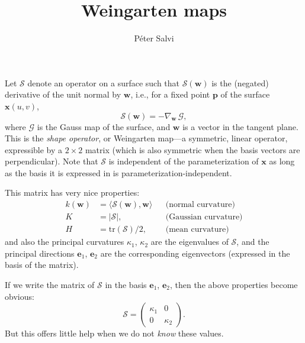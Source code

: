 \documentclass[a4paper]{article}
\begin{document}
\title{Weingarten maps}
\author{P\'eter Salvi}
\maketitle

Let $\mathcal{S}$ denote an operator on a surface such that $\mathcal{S}(\mathbf{w})$ is the
(negated) derivative of the unit normal by $\mathbf{w}$, i.e., for a fixed
point $\mathbf{p}$ of the surface $\mathbf{x}(u,v)$,
\[\mathcal{S}(\mathbf{w})=-\nabla_{\mathbf{w}}\,\mathcal{G},\]
where $\mathcal{G}$ is the Gauss map of the surface, and $\mathbf{w}$ is a
vector in the tangent plane. This is the \emph{shape operator}, or
Weingarten map---a symmetric, linear operator, expressible by a
$2\times2$ matrix (which is also symmetric when the basis vectors are
perpendicular). Note that $\mathcal{S}$ is independent of the parameterization
of $\mathbf{x}$ as long as the basis it is expressed in is
parameterization-independent.

This matrix has very nice properties:
\begin{align*}
  k(\mathbf{w})&=\langle \mathcal{S}(\mathbf{w}),\mathbf{w}\rangle&&\text{(normal curvature)}\\
  K&=|\mathcal{S}|,&&\text{(Gaussian curvature)}\\
  H&=\mathrm{tr}(\mathcal{S})/2,&&\text{(mean curvature)}
\end{align*}
and also the principal curvatures $\kappa_1$, $\kappa_2$ are the
eigenvalues of $\mathcal{S}$, and the principal directions $\mathbf{e}_1$,
$\mathbf{e}_2$ are the corresponding eigenvectors (expressed in the
basis of the matrix).

If we write the matrix of $\mathcal{S}$ in the basis $\mathbf{e}_1$,
$\mathbf{e}_2$, then the above properties become obvious:
\begin{equation}
  \mathcal{S}=
  \begin{pmatrix}
    \kappa_1 & 0 \\
    0 & \kappa_2
  \end{pmatrix}.
  \label{eq:S}
\end{equation}
But this offers little help when we do not \emph{know} these values.
\end{document}
